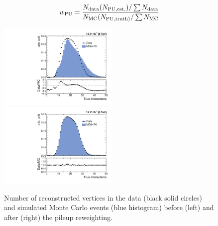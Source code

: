 \begin{equation}
\label{eq:reweigh}
 {w_{\rm PU} = \frac {N_{\rm data} (N_{\rm PU,est.})/\sum N_{\rm data}} {N_{\rm MC} (N_{\rm PU,truth)}/\sum N_{\rm MC}}}
\end{equation}

\begin{figure}[ht]
 \begin{center}
 \hspace*{-5mm}\includegraphics[width=0.51\textwidth]{Plots_HT_2_150/Nvertices.pdf}%
 ~~\includegraphics[width=0.51\textwidth]{Plots_HT_2_150/Nvertices_weight.pdf}
 \caption[Number of reconstructed vertices before and after the pileup reweighting.]{Number of reconstructed vertices in the data (black solid circles) and simulated Monte Carlo events (blue histogram) before (left) and after (right) the pileup reweighting.}
 \label{fig:pileup}
 \end{center}
\end{figure}

